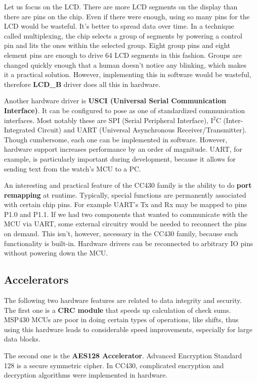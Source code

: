 Let us focus on the LCD. There are more LCD segments on the display
than there are pins on the chip. Even if there were enough, using so
many pins for the LCD would be wasteful. It's better to spread data
over time. In a technique called multiplexing, the chip selects a
group of segments by powering
a control pin and lits the ones within the selected group. Eight group
pins and eight element pins are enough to drive 64 LCD segments in
this fashion. Groups are changed quickly enough that a human doesn't
notice any blinking, which makes it a practical solution.  However,
implementing this in software would be wasteful, therefore {\bf
LCD\_B} driver does all this in hardware.

Another hardware driver is {\bf USCI (Universal Serial
Communication Interface)}. It can be configured to pose as one of
standardized communication interfaces. Most notably these are SPI
(Serial Peripheral Interface), I$^2$C (Inter-Integrated Circuit) and
UART (Universal Asynchronous Receiver/Transmitter). Though cumbersome,
each one can be implemented in software. However, hardware support
increases performance by an order of magnitude. UART, for example, is
particularly important during development, because it allows for sending
text from the watch's MCU to a PC.

An interesting and practical feature of the CC430 family is the
ability to do {\bf port remapping} at runtime. Typically, special
functions are permanently associated with certain chip pins. For example UART's
Tx and Rx may be mapped to pins P1.0 and P1.1. If we had two
components that wanted to communicate with the MCU via UART, some
external circuitry would be needed to reconnect the pins on demand.
This isn't, however, necessary in the CC430 family, because such
functionality is built-in. Hardware drivers can be reconnected to
arbitrary IO pins without powering down the MCU.

\subsection{Accelerators}
The following two hardware features are related to data integrity and
security. The first one is a {\bf CRC module} that speeds up
calculation of check sums.  MSP430 MCUs are poor in doing certain
types of operations, like shifts, thus using this hardware leads to
considerable speed improvements, especially for large data blocks.

The second one is the {\bf AES128 Accelerator}. Advanced Encryption
Standard 128 is a secure symmetric cipher. In CC430, complicated
encryption and decryption algorithms were implemented in hardware.

